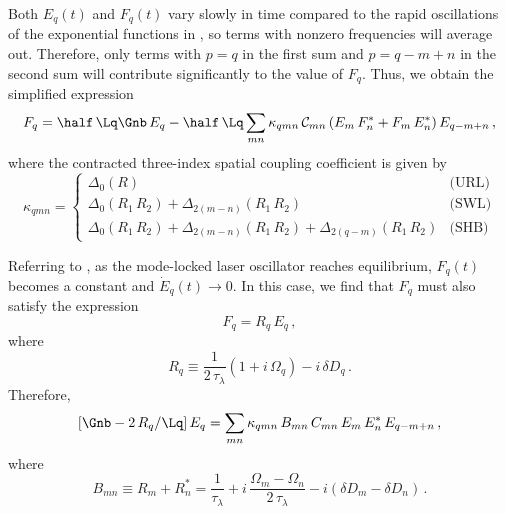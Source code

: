 Both $E_q(t)$ and $F_q(t)$ vary slowly in time compared to the rapid oscillations of the exponential functions in , so terms with nonzero frequencies will average out. Therefore, only terms with $p = q$ in the first sum and $p = q - m + n$ in the second sum will contribute significantly to the value of $F_q$. Thus, we obtain the simplified expression
\begin{equation}
    \label{eqn:mml_fq_mml}
    F_q = \half\, \Lq \Gnb\, E_q
    - \half\, \Lq \sum_{m n} \kappa_{q m n}\, \mathcal{C}_{m n} \left( E_m\, F_n^\ast + F_m\, E_n^\ast \right) E_{q - m + n}\, ,
\end{equation}
where the contracted three-index spatial coupling coefficient is given by
\begin{equation}
    \kappa_{q m n} = \begin{cases}
      \Delta_0(R) & \text{(URL)}\\
      \Delta_0(R_1\, R_2) + \Delta_{2(m - n)}(R_1\, R_2) & \text{(SWL)} \\
      \Delta_0(R_1\, R_2) + \Delta_{2(m - n)}(R_1\, R_2) + \Delta_{2(q - m)}(R_1\, R_2) & \text{(SHB)}
    \end{cases}
\end{equation}

Referring to , as the mode-locked laser oscillator reaches equilibrium, $F_q(t)$ becomes a constant and $\dot{E}_q(t) \longrightarrow 0$. In this case, we find that $F_q$ must also satisfy the expression
\begin{equation}
    F_q = R_q\, E_q\, ,
\end{equation}
where
\begin{equation}
    R_q \equiv \frac{1}{2\, \tau_\lambda} \left(1 + i\, \Omega_q\right) - i\, \delta D_q\, .
\end{equation}
Therefore,
\begin{equation}
    \left[ \Gnb - 2\, R_q  / \Lq\right] E_q
    = \sum_{m n} \kappa_{q m n}\, B_{m n}\, C_{m n}\, E_m\, E_n^\ast\, E_{q - m + n}\, ,
\end{equation}
where
\begin{equation}
    B_{m n} \equiv R_m + R_n^\ast = \frac{1}{\tau_\lambda} + i\, \frac{\Omega_m - \Omega_n}{2\, \tau_\lambda} - i \left(\delta D_m - \delta D_n\right)\, .
\end{equation}

